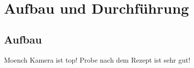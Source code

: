 \newpage
\section{Aufbau und Durchführung}
\subsection{Aufbau}
Moench Kamera \cite{cartier_micron_2014} ist top!
Probe nach dem Rezept \cite{tripathi_dichroic_2011} ist sehr gut!

